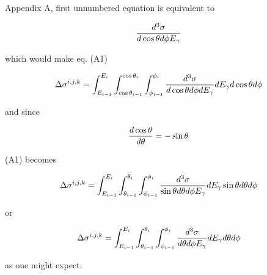 \documentclass{article}
\begin{document}
Appendix A, first unnumbered equation is equivalent to 

$${d^3\sigma \over d\cos\theta d\phi E_\gamma}$$

which would make eq. (A1)

$$\Delta\sigma^{i,j,k} = \int^{E_i}_{E_{i-1}}\int^{\cos\theta_i}_{\cos\theta_{i-1}}\int^{\phi_i}_{\phi_{i-1}} {d^3\sigma \over d\cos\theta d\phi dE_\gamma}dE_\gamma d\cos\theta d\phi$$

and since

$${d\cos\theta \over d\theta} = -\sin\theta$$

(A1) becomes

$$\Delta\sigma^{i,j,k} = \int^{E_i}_{E_{i-1}}\int^{\theta_i}_{\theta_{i-1}}\int^{\phi_i}_{\phi_{i-1}} {d^3\sigma \over \sin\theta d\theta d\phi E_\gamma} dE_\gamma \sin\theta d\theta d\phi$$

or

$$\Delta\sigma^{i,j,k} = \int^{E_i}_{E_{i-1}}\int^{\theta_i}_{\theta_{i-1}}\int^{\phi_i}_{\phi_{i-1}} {d^3\sigma \over d\theta d\phi E_\gamma} dE_\gamma d\theta d\phi$$

as one might expect.
\end{document}
